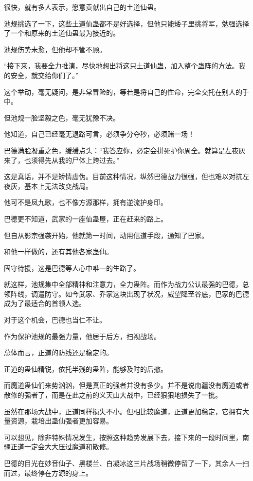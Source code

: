 \begin{this_body}
很快，就有多人表示，愿意贡献出自己的土道仙蛊。

池规挑选了一下，这些土道仙蛊都不是好选择，但他只能矮子里挑将军，勉强选择了一个和原来的土道仙蛊最为接近的。

池规伤势未愈，但他却不管不顾。

“接下来，我要全力推演，尽快地想出将这只土道仙蛊，加入整个蛊阵的方法。我的安全，就交给你们了。”

这个举动，毫无疑问，是非常冒险的，等若是将自己的性命，完全交托在别人的手中。

但池规一脸坚毅之色，毫无犹豫不决。

他知道，自己已经毫无退路可言，必须争分夺秒，必须赌一场！

巴德满脸凝重之色，缓缓点头：“我答应你，必定会拼死护你周全。就算是左夜灰来了，也须得先从我的尸体上跨过去。”

这是真话，并不是矫情虚伪。目前这种情况，纵然巴德战力很强，但也难以对抗左夜灰，基本上无法改变战局。

他可不是凤九歌，也不像方源那样，拥有逆流护身印。

巴德更不知道，武家的一座仙蛊屋，正在赶来的路上。

但自从影宗强袭开始，他就第一时间，动用信道手段，通知了巴家。

和他一样做的，还有其他各家蛊仙。

固守待援，这是巴德等人心中唯一的生路了。

就这样，池规集中全部精神和注意力，全力蛊阵。而作为战力公认最强的巴德，总领阵线，调遣防守。如今武家、乔家这块出现了状况，威望降至谷底，巴家的巴德成为了最适合的首领人选。

对于这个机会，巴德也当仁不让。

作为保护池规的最强力量，他居于后方，扫视战场。

总体而言，正道的防线还是稳定的。

正道的蛊仙精锐，依托半残的蛊阵，能够及时的后撤。

而魔道蛊仙们来势汹汹，但是真正的强者并没有多少。并不是说南疆没有魔道或者散修的强者了，而是在此之前的义天山大战中，已经狠狠地损失了一批。

虽然在那场大战中，正道同样损失不小。但相比较魔道，正道更加稳定，它拥有大量资源，栽培出蛊仙强者更加容易。

可以想见，除非特殊情况发生，按照这种趋势发展下去，接下来的一段时间里，南疆正道一定会大大压过魔道和散修。

巴德的目光在妙音仙子、黑楼兰、白凝冰这三片战场稍微停留了一下，其余人一扫而过，最终停在方源的身上。


\end{this_body}
